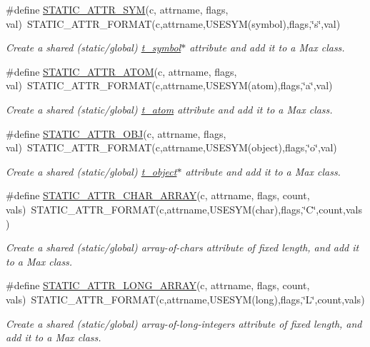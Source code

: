\begin{DoxyCompactItemize}
\#define \hyperlink{group__attr_ga315d33e09177e091dc07758755993f0b}{STATIC\_\-ATTR\_\-SYM}(c, attrname, flags, val)~STATIC\_\-ATTR\_\-FORMAT(c,attrname,USESYM(symbol),flags,\char`\"{}s\char`\"{},val)
\begin{DoxyCompactList}\small\item\em Create a shared (static/global) \hyperlink{structt__symbol}{t\_\-symbol}$\ast$ attribute and add it to a Max class. \item\end{DoxyCompactList}\item 
\#define \hyperlink{group__attr_gaec89cd6df31efd155711a03c55f9d2db}{STATIC\_\-ATTR\_\-ATOM}(c, attrname, flags, val)~STATIC\_\-ATTR\_\-FORMAT(c,attrname,USESYM(atom),flags,\char`\"{}a\char`\"{},val)
\begin{DoxyCompactList}\small\item\em Create a shared (static/global) \hyperlink{structt__atom}{t\_\-atom} attribute and add it to a Max class. \item\end{DoxyCompactList}\item 
\#define \hyperlink{group__attr_ga14283a1fa1076d8cecd4b86565baa024}{STATIC\_\-ATTR\_\-OBJ}(c, attrname, flags, val)~STATIC\_\-ATTR\_\-FORMAT(c,attrname,USESYM(object),flags,\char`\"{}o\char`\"{},val)
\begin{DoxyCompactList}\small\item\em Create a shared (static/global) \hyperlink{structt__object}{t\_\-object}$\ast$ attribute and add it to a Max class. \item\end{DoxyCompactList}\item 
\#define \hyperlink{group__attr_gaf3fb04659d50f1c0eb0ed8f821a9a355}{STATIC\_\-ATTR\_\-CHAR\_\-ARRAY}(c, attrname, flags, count, vals)~STATIC\_\-ATTR\_\-FORMAT(c,attrname,USESYM(char),flags,\char`\"{}C\char`\"{},count,vals)
\begin{DoxyCompactList}\small\item\em Create a shared (static/global) array-\/of-\/chars attribute of fixed length, and add it to a Max class. \item\end{DoxyCompactList}\item 
\#define \hyperlink{group__attr_gad149c4538e87a6a45ea35a28c1c85929}{STATIC\_\-ATTR\_\-LONG\_\-ARRAY}(c, attrname, flags, count, vals)~STATIC\_\-ATTR\_\-FORMAT(c,attrname,USESYM(long),flags,\char`\"{}L\char`\"{},count,vals)
\begin{DoxyCompactList}\small\item\em Create a shared (static/global) array-\/of-\/long-\/integers attribute of fixed length, and add it to a Max class. \item\end{DoxyCompactList}\item 

\end{DoxyCompactItemize}
